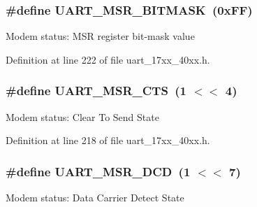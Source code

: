 \subsubsection[{\texorpdfstring{U\+A\+R\+T\+\_\+\+M\+S\+R\+\_\+\+B\+I\+T\+M\+A\+SK}{UART_MSR_BITMASK}}]{\setlength{\rightskip}{0pt plus 5cm}\#define U\+A\+R\+T\+\_\+\+M\+S\+R\+\_\+\+B\+I\+T\+M\+A\+SK~(0x\+F\+F)}\hypertarget{group__UART__17XX__40XX_ga79745d229ade663104e0a00c7597aa45}{}\label{group__UART__17XX__40XX_ga79745d229ade663104e0a00c7597aa45}
Modem status\+: M\+SR register bit-\/mask value 

Definition at line 222 of file uart\+\_\+17xx\+\_\+40xx.\+h.

\subsubsection[{\texorpdfstring{U\+A\+R\+T\+\_\+\+M\+S\+R\+\_\+\+C\+TS}{UART_MSR_CTS}}]{\setlength{\rightskip}{0pt plus 5cm}\#define U\+A\+R\+T\+\_\+\+M\+S\+R\+\_\+\+C\+TS~(1 $<$$<$ 4)}\hypertarget{group__UART__17XX__40XX_ga2cd867126cafb765b3d690e10f79b4c0}{}\label{group__UART__17XX__40XX_ga2cd867126cafb765b3d690e10f79b4c0}
Modem status\+: Clear To Send State 

Definition at line 218 of file uart\+\_\+17xx\+\_\+40xx.\+h.

\subsubsection[{\texorpdfstring{U\+A\+R\+T\+\_\+\+M\+S\+R\+\_\+\+D\+CD}{UART_MSR_DCD}}]{\setlength{\rightskip}{0pt plus 5cm}\#define U\+A\+R\+T\+\_\+\+M\+S\+R\+\_\+\+D\+CD~(1 $<$$<$ 7)}\hypertarget{group__UART__17XX__40XX_ga9a85f5379c5d15ebc486c4b174196afb}{}\label{group__UART__17XX__40XX_ga9a85f5379c5d15ebc486c4b174196afb}
Modem status\+: Data Carrier Detect State 

